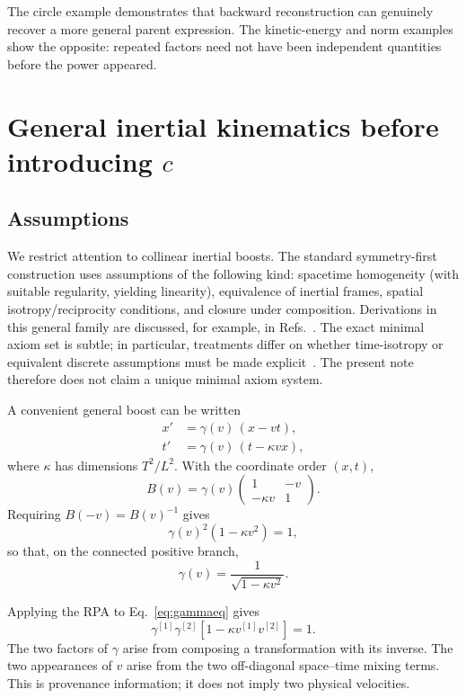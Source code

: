 \documentclass[11pt,a4paper]{article}
\newcommand{\kpar}{\kappa}
\begin{document}
The circle example demonstrates that backward reconstruction can genuinely recover a more general parent expression. The kinetic-energy and norm examples show the opposite: repeated factors need not have been independent quantities before the power appeared.

\section{General inertial kinematics before introducing \texorpdfstring{$c$}{c}}
\subsection{Assumptions}
We restrict attention to collinear inertial boosts. The standard symmetry-first construction uses assumptions of the following kind: spacetime homogeneity (with suitable regularity, yielding linearity), equivalence of inertial frames, spatial isotropy/reciprocity conditions, and closure under composition. Derivations in this general family are discussed, for example, in Refs.~\cite{certik2007,pelissetto2015,tan2026}. The exact minimal axiom set is subtle; in particular, treatments differ on whether time-isotropy or equivalent discrete assumptions must be made explicit~\cite{dey2017}. The present note therefore does not claim a unique minimal axiom system.

A convenient general boost can be written
\begin{align}
x' &= \gamma(v)\,(x-vt), \\
t' &= \gamma(v)\,(t-\kpar v x),
\label{eq:boosts}
\end{align}
where $\kpar$ has dimensions $T^2/L^2$. With the coordinate order $(x,t)$,
\begin{equation}
B(v)=\gamma(v)
\begin{pmatrix}
1 & -v\\
-\kpar v & 1
\end{pmatrix}.
\end{equation}
Requiring $B(-v)=B(v)^{-1}$ gives
\begin{equation}
\gamma(v)^2\left(1-\kpar v^2\right)=1,
\label{eq:gammaeq}
\end{equation}
so that, on the connected positive branch,
\begin{equation}
\gamma(v)=\frac{1}{\sqrt{1-\kpar v^2}}.
\label{eq:gamma}
\end{equation}

Applying the RPA to Eq.~\eqref{eq:gammaeq} gives
\begin{equation}
\gamma^{[1]}\gamma^{[2]}
\left[1-\kpar v^{[1]}v^{[2]}\right]=1.
\end{equation}
The two factors of $\gamma$ arise from composing a transformation with its inverse. The two appearances of $v$ arise from the two off-diagonal space--time mixing terms. This is provenance information; it does not imply two physical velocities.
\end{document}
